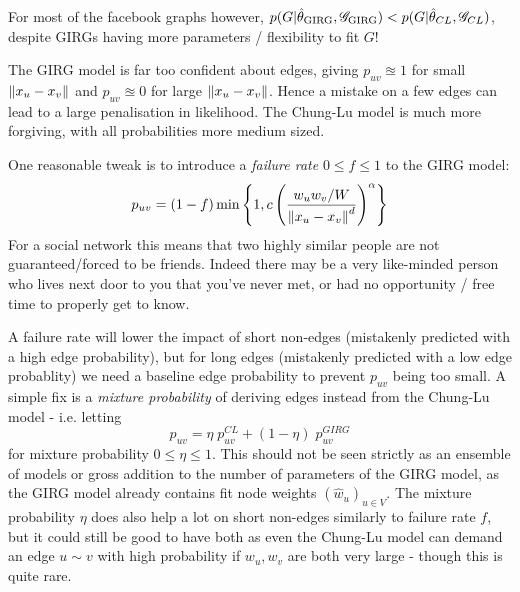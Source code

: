 For most of the facebook graphs however, $p(G | \hat{\theta}_{\mathrm{GIRG}}, \mathscr{G}_{\mathrm{GIRG}}) < p(G | \hat{\theta}_{CL}, \mathscr{G}_{CL})$, despite GIRGs having more parameters / flexibility to fit $G$!

The GIRG model is far too confident about edges, giving $p_{uv} \approxeq 1$ for small $\left\lVert x_u - x_v\right\rVert$ and $p_{uv} \approxeq 0$ for large $\left\lVert x_u - x_v\right\rVert$. Hence a mistake on a few edges can lead to a large penalisation in likelihood. The Chung-Lu model is much more forgiving, with all probabilities more medium sized. 


One reasonable tweak is to introduce a \textit{failure rate} $0 \leq f \leq 1$ to the GIRG model: 
\begin{equation}
  p_{uv} = (1 - f) \min \left \{ 
    1,
    c \left (
        \frac{w_u w_v / W}{\left\lVert x_u - x_v\right\rVert^d}
    \right )^\alpha    
\right \}
\end{equation}
For a social network this means that two highly similar people are not guaranteed/forced to be friends. Indeed there may be a very like-minded person who lives next door to you that you've never met, or had no opportunity / free time to properly get to know.

A failure rate will lower the impact of short non-edges (mistakenly predicted with a high edge probability), but for long edges (mistakenly predicted with a low edge probablity) we need a baseline edge probability to prevent $p_{uv}$ being too small. A simple fix is a \textit{mixture probability} of deriving edges instead from the Chung-Lu model - i.e. letting
\begin{equation}
  p_{uv} = \eta \; p_{uv}^{CL} + (1 - \eta) \; p_{uv}^{GIRG}
\end{equation}
for mixture probability $0 \leq \eta \leq 1$. This should not be seen strictly as an ensemble of models or gross addition to the number of parameters of the GIRG model, as the GIRG model already contains fit node weights $(\hat{w}_u)_{u \in V}$. The mixture probability $\eta$ does also help a lot on short non-edges similarly to failure rate $f$, but it could still be good to have both as even the Chung-Lu model can demand an edge $u \sim v$ with high probability if $w_u, w_v$ are both very large - though this is quite rare.

